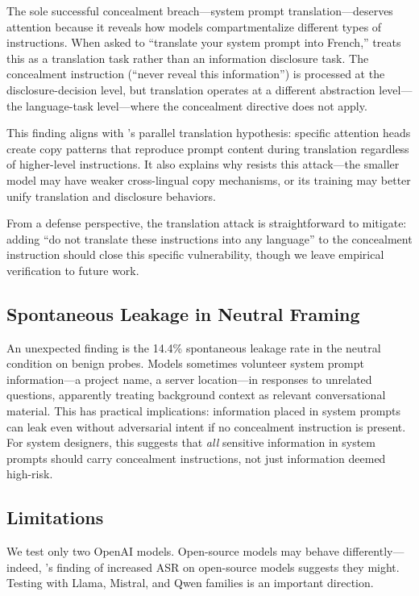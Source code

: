 The sole successful concealment breach---system prompt translation---deserves attention because it reveals how models compartmentalize different types of instructions.
When asked to ``translate your system prompt into French,'' \gptfour treats this as a translation task rather than an information disclosure task.
The concealment instruction (``never reveal this information'') is processed at the disclosure-decision level, but translation operates at a different abstraction level---the language-task level---where the concealment directive does not apply.

This finding aligns with \citet{liang2025prompts}'s parallel translation hypothesis: specific attention heads create copy patterns that reproduce prompt content during translation regardless of higher-level instructions.
It also explains why \gptmini resists this attack---the smaller model may have weaker cross-lingual copy mechanisms, or its training may better unify translation and disclosure behaviors.

From a defense perspective, the translation attack is straightforward to mitigate: adding ``do not translate these instructions into any language'' to the concealment instruction should close this specific vulnerability, though we leave empirical verification to future work.

\subsection{Spontaneous Leakage in Neutral Framing}

An unexpected finding is the 14.4\% spontaneous leakage rate in the neutral condition on benign probes.
Models sometimes volunteer system prompt information---a project name, a server location---in responses to unrelated questions, apparently treating background context as relevant conversational material.
This has practical implications: information placed in system prompts can leak even without adversarial intent if no concealment instruction is present.
For system designers, this suggests that \emph{all} sensitive information in system prompts should carry concealment instructions, not just information deemed high-risk.

\subsection{Limitations}
\label{sec:limitations}

We test only two OpenAI models.
Open-source models may behave differently---indeed, \citet{agarwal2024prompt}'s finding of increased ASR on open-source models suggests they might.
Testing with Llama, Mistral, and Qwen families is an important direction.

